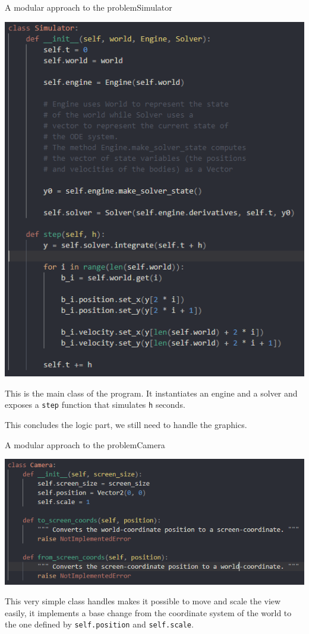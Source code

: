 \documentclass[colorlinks]{beamer}
\begin{document}
\begin{frame}[fragile]{A modular approach to the problem}{Simulator}
    {
        \centering
        \includegraphics[height=.6\textheight]{Simulator.png}
        \par
    }
    
    This is the main class of the program. It instantiates an engine and a solver and exposes a \texttt{step} function that simulates \texttt{h} seconds.
    
    This concludes the logic part, we still need to handle the graphics.
\end{frame}

\begin{frame}[fragile]{A modular approach to the problem}{Camera}
    {
        \centering
        \includegraphics[width=\textwidth]{Camera.png}
        \par
    }
    
    This very simple class handles makes it possible to move and scale the view easily, it implements a base change from the coordinate system of the world to the one defined by \texttt{self.position} and \texttt{self.scale}.
\end{frame}
\end{document}
